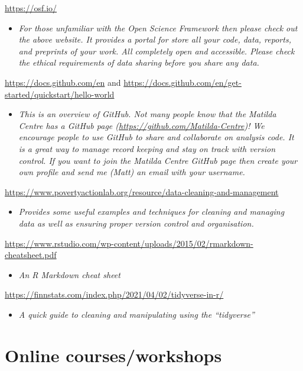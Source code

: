 \documentclass[
]{book}
\providecommand{\tightlist}{%
  \setlength{\itemsep}{0pt}\setlength{\parskip}{0pt}}
\begin{document}
\url{https://osf.io/}

\begin{itemize}
\tightlist
\item
  \emph{For those unfamiliar with the Open Science Framework then please check out the above website. It provides a portal for store all your code, data, reports, and preprints of your work. All completely open and accessible. Please check the ethical requirements of data sharing before you share any data.}
\end{itemize}

\url{https://docs.github.com/en} and \url{https://docs.github.com/en/get-started/quickstart/hello-world}

\begin{itemize}
\tightlist
\item
  \emph{This is an overview of GitHub. Not many people know that the Matilda Centre has a GitHub page (\url{https://github.com/Matilda-Centre})! We encourage people to use GitHub to share and collaborate on analysis code. It is a great way to manage record keeping and stay on track with version control. If you want to join the Matilda Centre GitHub page then create your own profile and send me (Matt) an email with your username.}
\end{itemize}

\url{https://www.povertyactionlab.org/resource/data-cleaning-and-management}

\begin{itemize}
\tightlist
\item
  \emph{Provides some useful examples and techniques for cleaning and managing data as well as ensuring proper version control and organisation.}
\end{itemize}

\url{https://www.rstudio.com/wp-content/uploads/2015/02/rmarkdown-cheatsheet.pdf}

\begin{itemize}
\tightlist
\item
  \emph{An R Markdown cheat sheet}
\end{itemize}

\url{https://finnstats.com/index.php/2021/04/02/tidyverse-in-r/}

\begin{itemize}
\tightlist
\item
  \emph{A quick guide to cleaning and manipulating using the ``tidyverse''}
\end{itemize}

\hypertarget{online-coursesworkshops}{%
\section{Online courses/workshops}\label{online-coursesworkshops}}
\end{document}
